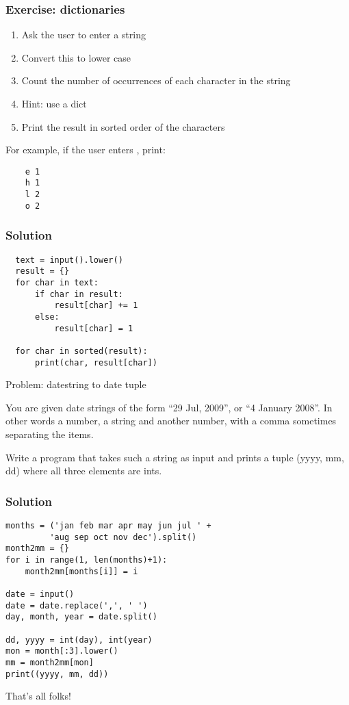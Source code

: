 \documentclass[14pt,compress]{beamer}
\begin{document}
\begin{frame}
  \frametitle{Exercise: dictionaries}
  \begin{enumerate}
  \item Ask the user to enter a string
  \item Convert this to lower case
  \item Count the number of occurrences of each character in the string
  \item Hint: use a dict
  \item Print the result in sorted order of the characters
  \end{enumerate}
  For example, if the user enters , print:
  \begin{lstlisting}
    e 1
    h 1
    l 2
    o 2
  \end{lstlisting}
\end{frame}

\begin{frame}
\frametitle{Solution}
\begin{lstlisting}
  text = input().lower()
  result = {}
  for char in text:
      if char in result:
          result[char] += 1
      else:
          result[char] = 1

  for char in sorted(result):
      print(char, result[char])
\end{lstlisting}
\end{frame}


\begin{frame}[plain]
  {Problem: datestring to date tuple}

  You are given date strings of the form ``29 Jul, 2009'', or ``4 January
  2008''. In other words a number, a string and another number, with a comma
  sometimes separating the items.

  Write a program that takes such a string as input and prints a tuple (yyyy,
  mm, dd) where all three elements are ints.
\end{frame}

\begin{frame}[fragile]
  \frametitle{Solution}
 \small
  \begin{lstlisting}
months = ('jan feb mar apr may jun jul ' +
         'aug sep oct nov dec').split()
month2mm = {}
for i in range(1, len(months)+1):
    month2mm[months[i]] = i

date = input()
date = date.replace(',', ' ')
day, month, year = date.split()

dd, yyyy = int(day), int(year)
mon = month[:3].lower()
mm = month2mm[mon]
print((yyyy, mm, dd))
\end{lstlisting}
\end{frame}

\begin{frame}
  \centering
  \Huge

  That's all folks!
\end{frame}
\end{document}
